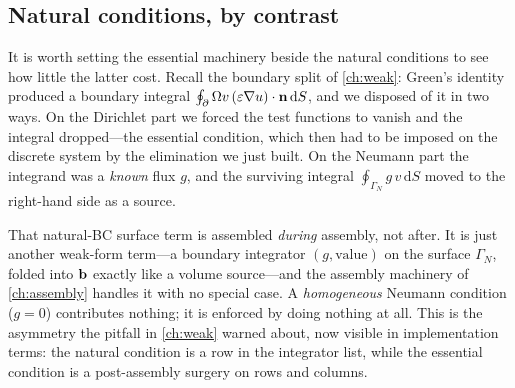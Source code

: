 \subsection{Natural conditions, by contrast}
\label{sec:natural}

It is worth setting the essential machinery beside the natural conditions to see
how little the latter cost. Recall the boundary split of \cref{ch:weak}: Green's
identity produced a boundary integral $\oint_\partial\Omega v\,(\varepsilon\nabla u)\cdot
\mathbf{n}\,\mathrm{d}S$, and we disposed of it in two ways. On the Dirichlet part we
forced the test functions to vanish and the integral dropped---the essential
condition, which then had to be imposed on the discrete system by the elimination
we just built. On the Neumann part the integrand was a \emph{known} flux $g$, and
the surviving integral $\oint_{\Gamma_N} g\,v\,\mathrm{d}S$ moved to the
right-hand side as a source.

That natural-BC surface term is assembled \emph{during} assembly, not after. It is
just another weak-form term---a boundary integrator $(g,\text{value})$ on the
surface $\Gamma_N$, folded into $\mathbf{b}$ exactly like a volume source---and the
assembly machinery of \cref{ch:assembly} handles it with no special case. A
\emph{homogeneous} Neumann condition ($g=0$) contributes nothing; it is enforced
by doing nothing at all. This is the asymmetry the pitfall in \cref{ch:weak}
warned about, now visible in implementation terms: the natural condition is a row
in the integrator list, while the essential condition is a post-assembly surgery
on rows and columns.

